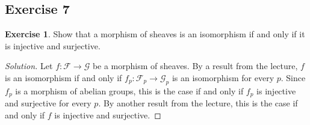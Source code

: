 \documentclass[a4paper]{amsbook}
\theoremstyle{definition}
\newtheorem*{exercise*}{Exercise}
\begin{document}
\subsection*{Exercise 7}
\label{Ex7}
\begin{exercise*}
\label{TheExercise}
Show that a morphism of sheaves is an isomorphism if and only if it is injective
and surjective.
\end{exercise*}
\begin{proof}[Solution]
Let $f\colon \mathcal{F}\to \mathcal{G}$ be a morphism of sheaves.
By a result from the lecture, $f$ is an isomorphism if and only if
$f_p\colon \mathcal{F}_p\to \mathcal{G}_p$ is an isomorphism for every $p$.
Since $f_p$ is a morphism of abelian groups, this is the case if and only if $f_p$
is injective and surjective for every $p$. By another result from the lecture,
this is the case if and only if $f$ is injective and surjective.
\end{proof}
\end{document}
